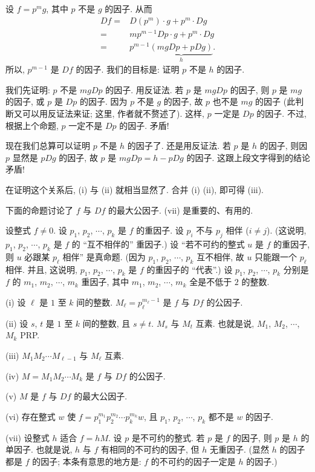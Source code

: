 \begin{pf}
    设 $f = p^m g$, 其中 $p$ 不是 $g$ 的因子. 从而
    \begin{align*}
        Df
        = {} & D(p^m) \cdot g + p^m \cdot Dg          \\
        = {} & mp^{m-1} Dp \cdot g + p^m \cdot Dg     \\
        = {} & p^{m-1} \underbrace{(mgDp + pDg)}_{h}.
    \end{align*}
    所以, $p^{m-1}$ 是 $Df$ 的因子. 我们的目标是: 证明 $p$ 不是 $h$ 的因子.

    我们先证明: $p$ 不是 $mgDp$ 的因子. 用反证法. 若 $p$ 是 $mgDp$ 的因子, 则 $p$ 是 $mg$ 的因子, 或 $p$ 是 $Dp$ 的因子. 因为 $p$ 不是 $g$ 的因子, 故 $p$ 也不是 $mg$ 的因子 (此判断又可以用反证法来证; 这里, 作者就不赘述了). 这样, $p$ 一定是 $Dp$ 的因子. 不过, 根据上个命题, $p$ 一定不是 $Dp$ 的因子. 矛盾!

    现在我们总算可以证明 $p$ 不是 $h$ 的因子了. 还是用反证法. 若 $p$ 是 $h$ 的因子, 则因 $p$ 显然是 $pDg$ 的因子, 故 $p$ 是 $mgDp = h - pDg$ 的因子. 这跟上段文字得到的结论矛盾!

    在证明这个关系后, (i) 与 (ii) 就相当显然了. 合并 (i) (ii), 即可得 (iii).
\end{pf}

下面的命题讨论了 $f$ 与 $Df$ 的最大公因子. (vii) 是重要的、有用的.

\begin{proposition}
    设整式 $f \neq 0$. 设 $p_1$, $p_2$, $\cdots$, $p_k$ 是 $f$ 的重因子. 设 $p_i$ 不与 $p_j$ 相伴 ($i \neq j$). (这说明, $p_1$, $p_2$, $\cdots$, $p_k$ 是 $f$ 的 ``互不相伴的'' 重因子.) 设 ``若不可约的整式 $u$ 是 $f$ 的重因子, 则 $u$ 必跟某 $p_\ell$ 相伴'' 是真命题. (因为 $p_1$, $p_2$, $\cdots$, $p_k$ 互不相伴, 故 $u$ 只能跟一个 $p_\ell$ 相伴. 并且, 这说明, $p_1$, $p_2$, $\cdots$, $p_k$ 是 $f$ 的重因子的 ``代表''.) 设 $p_1$, $p_2$, $\cdots$, $p_k$ 分别是 $f$ 的 $m_1$, $m_2$, $\cdots$, $m_k$ 重因子, 其中 $m_1$, $m_2$, $\cdots$, $m_k$ 全是不低于 $2$ 的整数.

    (i) 设 $\ell$ 是 $1$ 至 $k$ 间的整数. $M_\ell = p_\ell^{m_\ell - 1}$ 是 $f$ 与 $Df$ 的公因子.

    (ii) 设 $s$, $t$ 是 $1$ 至 $k$ 间的整数, 且 $s \neq t$. $M_s$ 与 $M_t$ 互素. 也就是说, $M_1$, $M_2$, $\cdots$, $M_k$ PRP.

    (iii) $M_1 M_2 \cdots M_{\ell - 1}$ 与 $M_\ell$ 互素.

    (iv) $M = M_1 M_2 \cdots M_k$ 是 $f$ 与 $Df$ 的公因子.

    (v) $M$ 是 $f$ 与 $Df$ 的最大公因子.

    (vi) 存在整式 $w$ 使 $f = p_1^{m_1} p_2^{m_2} \cdots p_k^{m_k} w$, 且 $p_1$, $p_2$, $\cdots$, $p_k$ 都不是 $w$ 的因子.

    (vii) 设整式 $h$ 适合 $f = hM$. 设 $p$ 是不可约的整式. 若 $p$ 是 $f$ 的因子, 则 $p$ 是 $h$ 的单因子. 也就是说, $h$ 与 $f$ 有相同的不可约的因子, 但 $h$ 无重因子. (显然 $h$ 的因子都是 $f$ 的因子; 本条有意思的地方是: $f$ 的不可约的因子一定是 $h$ 的因子.)
\end{proposition}

